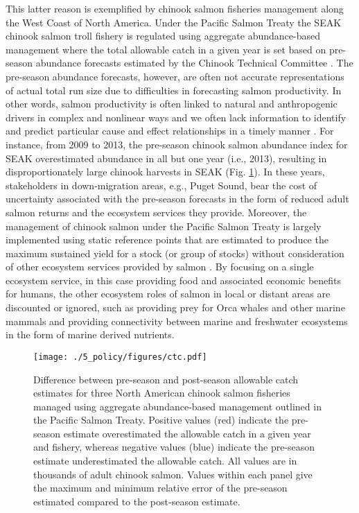 This latter reason is exemplified by chinook salmon fisheries management along
the West Coast of North America. Under the Pacific Salmon Treaty the SEAK
chinook salmon troll fishery is regulated using aggregate abundance-based
management where the total allowable catch in a given year is set based on
pre-season abundance forecasts estimated by the Chinook Technical Committee
\citep[Annex IV, Chapter 3, Section 6, pg. 66]{PST2014}. The pre-season
abundance forecasts, however, are often not accurate representations of actual
total run size due to difficulties in forecasting salmon productivity. In other
words, salmon productivity is often linked to natural and anthropogenic drivers
in complex and nonlinear ways and we often lack information to identify and
predict particular cause and effect relationships in a timely manner
\citep{Peterman2012, Malick2016a, Myers1998b}. For instance, from 2009 to 2013,
the pre-season chinook salmon abundance index for SEAK overestimated abundance
in all but one year (i.e., 2013), resulting in disproportionately large chinook
harvests in SEAK \citep{CTC2015a} (Fig. \ref{fig:ebm:2}). In these years,
stakeholders in down-migration areas, e.g., Puget Sound, bear the cost of
uncertainty associated with the pre-season forecasts in the form of reduced
adult salmon returns and the ecosystem services they provide. Moreover, the
management of chinook salmon under the Pacific Salmon Treaty is largely
implemented using static reference points that are estimated to produce the
maximum sustained yield for a stock (or group of stocks) without consideration
of other ecosystem services provided by salmon \citep{CTC2015b}. By focusing on
a single ecosystem service, in this case providing food and associated economic
benefits for humans, the other ecosystem roles of salmon in local or distant
areas are discounted or ignored, such as providing prey for Orca whales and
other marine mammals and providing connectivity between marine and freshwater
ecosystems in the form of marine derived nutrients.

\begin{figure}[htbp]
  \centering \texttt{[image: ./5\_policy/figures/ctc.pdf]}
  \caption[Difference between pre-season and post-season allowable catch
           estimates for three North American chinook salmon
           fisheries]{Difference between pre-season and post-season allowable
           catch estimates for three North American chinook salmon fisheries
           managed using aggregate abundance-based management outlined in the
           Pacific Salmon Treaty. Positive values (red) indicate the pre-season
           estimate overestimated the allowable catch in a given year and
           fishery, whereas negative values (blue) indicate the pre-season
           estimate underestimated the allowable catch. All values are in
           thousands of adult chinook salmon. Values within each panel give the
           maximum and minimum relative error of the pre-season estimated
           compared to the post-season estimate.}
  \label{fig:ebm:2}
\end{figure}

